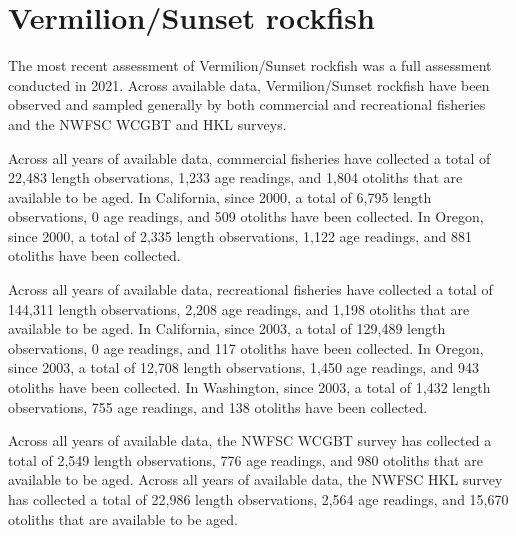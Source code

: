 \documentclass[11pt,
  english,
  letterpaper,
]{article}
\begin{document}

\hypertarget{vermilionsunset-rockfish}{%
\section{Vermilion/Sunset rockfish}\label{vermilionsunset-rockfish}}

\leavevmode\tagmcend\tagstructend


The most recent assessment of Vermilion/Sunset rockfish was a full assessment conducted in 2021. Across available data, Vermilion/Sunset rockfish have been observed and sampled generally by both commercial and recreational fisheries and the NWFSC WCGBT and HKL surveys.

\leavevmode\tagmcend\tagstructend\par


Across all years of available data, commercial fisheries have collected a total of 22,483 length observations, 1,233 age readings, and 1,804 otoliths that are available to be aged. In California, since 2000, a total of 6,795 length observations, 0 age readings, and 509 otoliths have been collected. In Oregon, since 2000, a total of 2,335 length observations, 1,122 age readings, and 881 otoliths have been collected.

\leavevmode\tagmcend\tagstructend\par


Across all years of available data, recreational fisheries have collected a total of 144,311 length observations, 2,208 age readings, and 1,198 otoliths that are available to be aged. In California, since 2003, a total of 129,489 length observations, 0 age readings, and 117 otoliths have been collected. In Oregon, since 2003, a total of 12,708 length observations, 1,450 age readings, and 943 otoliths have been collected. In Washington, since 2003, a total of 1,432 length observations, 755 age readings, and 138 otoliths have been collected.

\leavevmode\tagmcend\tagstructend\par


Across all years of available data, the NWFSC WCGBT survey has collected a total of 2,549 length observations, 776 age readings, and 980 otoliths that are available to be aged. Across all years of available data, the NWFSC HKL survey has collected a total of 22,986 length observations, 2,564 age readings, and 15,670 otoliths that are available to be aged.
\end{document}
